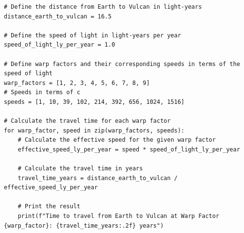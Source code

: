 \documentclass[class=book, crop=false]{standalone}
\begin{document}
\begin{lstlisting}[style=python-dracula, caption={Python Code to Calculate Travel Time from Earth to Vulcan}, label=lst:travel_time_code]
# Define the distance from Earth to Vulcan in light-years
distance_earth_to_vulcan = 16.5

# Define the speed of light in light-years per year
speed_of_light_ly_per_year = 1.0

# Define warp factors and their corresponding speeds in terms of the speed of light
warp_factors = [1, 2, 3, 4, 5, 6, 7, 8, 9]
# Speeds in terms of c
speeds = [1, 10, 39, 102, 214, 392, 656, 1024, 1516]

# Calculate the travel time for each warp factor
for warp_factor, speed in zip(warp_factors, speeds):
    # Calculate the effective speed for the given warp factor
    effective_speed_ly_per_year = speed * speed_of_light_ly_per_year
    
    # Calculate the travel time in years
    travel_time_years = distance_earth_to_vulcan / effective_speed_ly_per_year
    
    # Print the result
    print(f"Time to travel from Earth to Vulcan at Warp Factor {warp_factor}: {travel_time_years:.2f} years")
\end{lstlisting}
\end{document}

